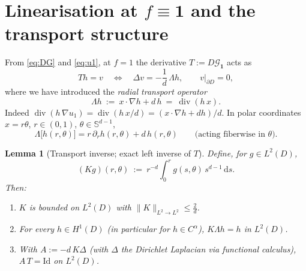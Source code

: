 \documentclass[11pt]{article}
\newtheorem{lemma}[theorem]{Lemma}
\newcommand{\1}{\mathbf{1}}
\newcommand{\norm}[1]{\lVert #1\rVert}
\newcommand{\ddd}{\mathrm{d}}
\newcommand{\Gf}{\mathcal{G}}
\DeclareMathOperator{\divg}{div}
\begin{document}
\section{Linearisation at $f\equiv\1$ and the transport structure}\label{sec:transport}

From \eqref{eq:DG} and \eqref{eq:u1}, at $f=1$ the derivative
$T:=D\Gf_{\1}$ acts as
\begin{equation}\label{eq:T}
Th=v\quad\Longleftrightarrow\quad
\Delta v=-\frac1d\,\Lambda h,\qquad v|_{\partial D}=0,
\end{equation}
where we have introduced the \emph{radial transport operator}
\begin{equation}\label{eq:Lambda}
\Lambda h\ :=\ x\cdot\nabla h+d\,h\ =\ \divg(h\,x) .
\end{equation}
Indeed $\divg(h\,\nabla u_1)=\divg(h\,x/d)=(x\cdot\nabla h+d h)/d$. In polar
coordinates $x=r\theta$, $r\in(0,1)$, $\theta\in\mathbb S^{d-1}$,
\begin{equation}\label{eq:Lambdafiber}
\Lambda\big[h(r,\theta)\big]=r\,\partial_r h(r,\theta)+d\,h(r,\theta)
\qquad\text{(acting fiberwise in $\theta$).}
\end{equation}

\begin{lemma}[Transport inverse; exact left inverse of $T$]\label{lem:transport}
Define, for $g\in L^2(D)$,
\begin{equation}\label{eq:K}
(Kg)(r,\theta)\ :=\ r^{-d}\int_0^r g(s,\theta)\,s^{d-1}\,\ddd s .
\end{equation}
Then:
\begin{enumerate}
\item[(i)] $K$ is bounded on $L^2(D)$ with $\norm K_{L^2\to L^2}\le \frac{2}{d}$.
\item[(ii)] For every $h\in H^1(D)$ (in particular for $h\in C^\alpha$),
$K\Lambda h=h$ in $L^2(D)$.
\item[(iii)] With $A:=-d\,K\Delta$ (with $\Delta$ the Dirichlet Laplacian via
functional calculus), $A\,T=\mathrm{Id}$ on $L^2(D)$.
\end{enumerate}
\end{lemma}
\end{document}
